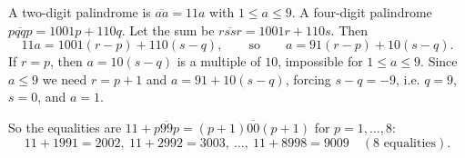 A two-digit palindrome is $\overline{aa}=11a$ with $1\le a\le9$. A four-digit palindrome $\overline{pqqp}=1001p+110q$. Let the sum be $\overline{rssr}=1001r+110s$. Then
\[11a=1001(r-p)+110(s-q),\qquad\text{so}\qquad a=91(r-p)+10(s-q).\]
If $r=p$, then $a=10(s-q)$ is a multiple of $10$, impossible for $1\le a\le9$. Since $a\le9$ we need $r=p+1$ and $a=91+10(s-q)$, forcing $s-q=-9$, i.e. $q=9$, $s=0$, and $a=1$.

So the equalities are $11+\overline{p99p}=\overline{(p+1)00(p+1)}$ for $p=1,\dots,8$:
\[11+1991=2002,\ 11+2992=3003,\ \dots,\ 11+8998=9009\quad(\boxed{8}\text{ equalities}).\]
